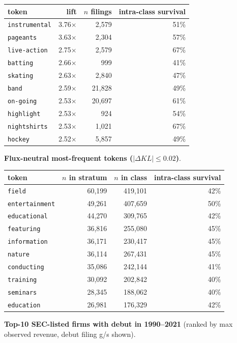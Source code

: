 \begin{tabular}{lrrr}
\toprule
token & lift & $n$ filings & intra-class survival \\
\midrule
\texttt{instrumental} & 3.76$\times$ & 2,579 & 51\% \\
\texttt{pageants} & 3.63$\times$ & 2,304 & 57\% \\
\texttt{live-action} & 2.75$\times$ & 2,579 & 67\% \\
\texttt{batting} & 2.66$\times$ & 999 & 41\% \\
\texttt{skating} & 2.63$\times$ & 2,840 & 47\% \\
\texttt{band} & 2.59$\times$ & 21,828 & 49\% \\
\texttt{on-going} & 2.53$\times$ & 20,697 & 61\% \\
\texttt{highlight} & 2.53$\times$ & 924 & 54\% \\
\texttt{nightshirts} & 2.53$\times$ & 1,021 & 67\% \\
\texttt{hockey} & 2.52$\times$ & 5,857 & 49\% \\
\bottomrule
\end{tabular}

\textbf{Flux-neutral most-frequent tokens ($|\Delta KL|\leq 0.02$)}.

\begin{tabular}{lrrr}
\toprule
token & $n$ in stratum & $n$ in class & intra-class survival \\
\midrule
\texttt{field} & 60,199 & 419,101 & 42\% \\
\texttt{entertainment} & 49,261 & 407,659 & 50\% \\
\texttt{educational} & 44,270 & 309,765 & 42\% \\
\texttt{featuring} & 36,816 & 255,080 & 45\% \\
\texttt{information} & 36,171 & 230,417 & 45\% \\
\texttt{nature} & 36,114 & 267,431 & 45\% \\
\texttt{conducting} & 35,086 & 242,144 & 41\% \\
\texttt{training} & 30,092 & 202,842 & 40\% \\
\texttt{seminars} & 28,345 & 188,062 & 40\% \\
\texttt{education} & 26,981 & 176,329 & 42\% \\
\bottomrule
\end{tabular}

\textbf{Top-10 SEC-listed firms with debut in 1990--2021} (ranked by max observed revenue, debut filing g/s shown).

